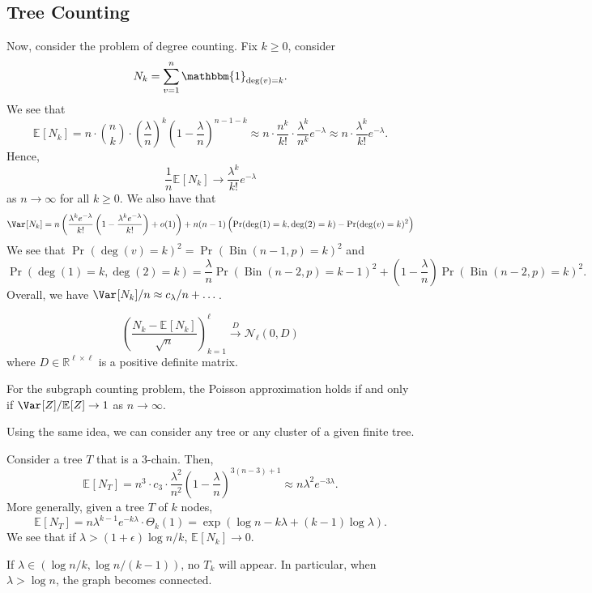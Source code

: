 \subsection{Tree Counting}
Now, consider the problem of degree counting. Fix \(k \geq 0\), consider
\[
	N_k = \sum_{v=1}^{n} \mathbbm{1}_{\deg (v) = k}.
\]
We see that
\[
	\mathbb{E}_{}[N_k]
	= n \cdot \binom{n}{k} \cdot \left( \frac{\lambda}{n} \right) ^k \left( 1 - \frac{\lambda}{n} \right) ^{n-1-k}
	\approx n \cdot \frac{n^k}{k!} \cdot \frac{\lambda ^k}{n^k} e^{-\lambda }
	\approx n \cdot \frac{\lambda ^k}{k!} e^{-\lambda }.
\]
Hence,
\[
	\frac{1}{n} \mathbb{E}_{}[N_k]
	\to \frac{\lambda ^k}{k!} e^{-\lambda }
\]
as \(n \to \infty \) for all \(k \geq 0\). We also have that
\[
	\Var_{}[N_k]
	= n \left( \frac{\lambda ^k e^{-\lambda }}{k!} \left( 1 - \frac{\lambda ^k e^{-\lambda }}{k!} \right) + o(1) \right) + n(n-1) \left( \Pr_{}(\deg (1) = k, \deg (2) = k) - \Pr_{}(\deg (v) = k)^2 \right)
\]
We see that \(\Pr_{}(\deg (v) = k)^2 = \Pr_{}(\operatorname{Bin}(n-1, p) =k)^2\) and
\[
	\Pr_{}(\deg (1) = k, \deg (2) = k)
	= \frac{\lambda}{n} \Pr_{}(\operatorname{Bin}(n-2, p) = k-1 ) ^2 + \left( 1 - \frac{\lambda}{n} \right) \Pr_{}(\operatorname{Bin}(n-2, p) = k )^2.
\]
Overall, we have \(\Var_{}[N_k] / n \approx c_\lambda / n + \dots \).

\begin{theorem}
	\[
		\left( \frac{N_k - \mathbb{E}_{}[N_k] }{\sqrt{n} } \right) _{k=1}^{\ell }
		\overset{D}{\to} \mathcal{N} _\ell (0, D)
	\]
	where \(D \in \mathbb{R} ^{\ell \times \ell }\) is a positive definite matrix.
\end{theorem}

\begin{remark}
	For the subgraph counting problem, the Poisson approximation holds if and only if \(\Var_{}[Z] / \mathbb{E}_{}[Z] \to 1\) as \(n \to \infty \).
\end{remark}

\begin{eg}
	Using the same idea, we can consider any tree or any cluster of a given finite tree.
\end{eg}

Consider a tree \(T\) that is a \(3\)-chain. Then,
\[
	\mathbb{E}_{}[N_T]
	= n^3 \cdot c_3 \cdot \frac{\lambda ^2}{n^2} \left( 1 - \frac{\lambda}{n} \right) ^{3 (n-3) + 1}
	\approx n \lambda ^2 e^{-3\lambda }.
\]
More generally, given a tree \(T\) of \(k\) nodes,
\[
	\mathbb{E}_{}[N_T]
	= n \lambda ^{k-1} e^{-k \lambda } \cdot \Theta _{k} (1)
	= \exp (\log n - k \lambda + (k-1) \log \lambda ).
\]
We see that if \(\lambda > (1 + \epsilon ) \log n / k\), \(\mathbb{E}_{}[N_k] \to 0\).

If \(\lambda \in (\log n / k, \log n / (k-1))\), no \(T_k\) will appear. In particular, when \(\lambda > \log n\), the graph becomes connected.